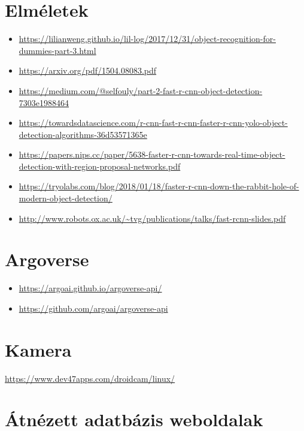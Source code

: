 \documentclass[12pt]{report}
\begin{document}
\chapter{Elméletek}
\begin{itemize}
\item \url{https://lilianweng.github.io/lil-log/2017/12/31/object-recognition-for-dummies-part-3.html}
\item \url{https://arxiv.org/pdf/1504.08083.pdf}
\item \url{https://medium.com/@selfouly/part-2-fast-r-cnn-object-detection-7303e1988464}
\item \url{https://towardsdatascience.com/r-cnn-fast-r-cnn-faster-r-cnn-yolo-object-detection-algorithms-36d53571365e}
\item \url{https://papers.nips.cc/paper/5638-faster-r-cnn-towards-real-time-object-detection-with-region-proposal-networks.pdf}
\item \url{https://tryolabs.com/blog/2018/01/18/faster-r-cnn-down-the-rabbit-hole-of-modern-object-detection/}
\item \url{http://www.robots.ox.ac.uk/~tvg/publications/talks/fast-rcnn-slides.pdf}
\end{itemize}

\chapter{Argoverse}
\begin{itemize}
	\item \url{https://argoai.github.io/argoverse-api/}
	\item \url{https://github.com/argoai/argoverse-api}
\end{itemize}


\chapter{Kamera}
\url{https://www.dev47apps.com/droidcam/linux/}

\chapter{Átnézett adatbázis weboldalak}
\end{document}
